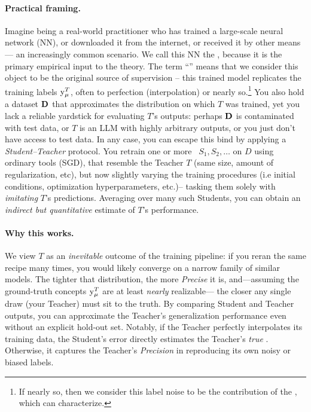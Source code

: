 \paragraph{Practical framing.}
Imagine being a real-world practitioner who has trained a large-scale neural network (NN), or downloaded it from the internet, or received it by other means --- an increasingly common scenario.
 We call this NN the \Teacher, because it is the primary empirical input to the theory. The term ``\Teacher'' means that we consider this object to be the original source of supervision -- this trained model replicates the training labels $\mathrm{y}_{\mu}^{T}$, often to perfection (interpolation) or nearly so.\footnote{If nearly so, then we consider this label noise to be the contribution of the \Teacher, which \SETOL can characterize.}
You also hold a dataset $\mathbf{D}$ that approximates the distribution on which $T$ was trained, yet you lack a reliable yardstick for evaluating $T$’s outputs: perhaps $\mathbf{D}$ is contaminated with test data, or $T$ is an LLM with highly arbitrary outputs, or you just
don't have access to test data.  In any case, you can escape this bind by applying a \emph{Student–Teacher} protocol.  
You retrain one or more \Students\ $S_{1},S_{2},\dots$ on $D$ using ordinary tools (SGD), that resemble the Teacher $T$
(same size, amount of regularization, etc),
but now slightly varying the training procedures (i.e  initial conditions, optimization hyperparameters, etc.)--
tasking them solely with \emph{imitating} $T$’s predictions. 
Averaging over many such Students, you can obtain an \emph{indirect but quantitative} estimate of $T$’s performance.

\paragraph{Why this works.}  
We view $T$ as an \textit{inevitable} outcome of the training pipeline: if you reran the same recipe many times, you would likely converge on a narrow family of similar models.  
The tighter that distribution, the more \emph{Precise} it is, and—assuming the ground-truth concepts $\mathrm{y}_{\mu}^{T}$
are at least \emph{nearly} realizable— the closer any single draw (your Teacher) must sit to the truth.  
By comparing Student and Teacher outputs, you can approximate the Teacher’s generalization performance even without an explicit hold-out set.  
Notably, if the Teacher perfectly interpolates its training data, the Student’s error directly estimates the Teacher’s \emph{true} \GeneralizationAccuracy.
Otherwise, it captures the Teacher’s \emph{Precision} in reproducing its own noisy or biased labels.

